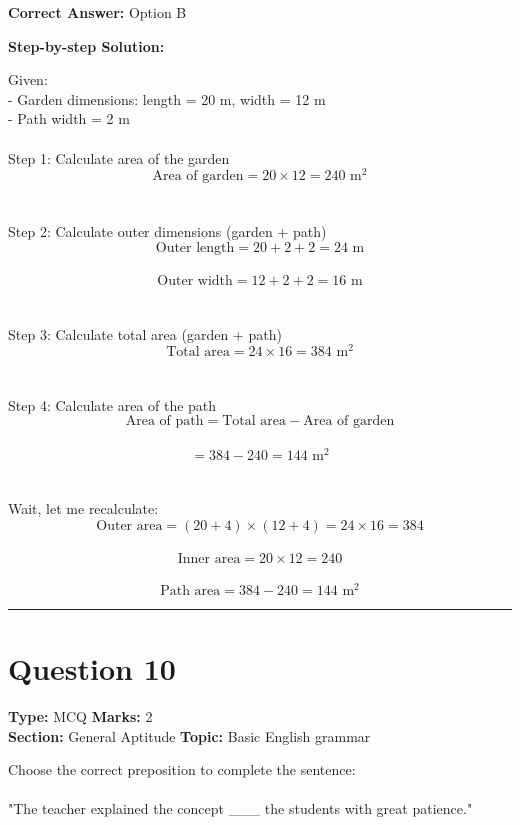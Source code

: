 \documentclass[11pt]{article}
\begin{document}
\textbf{Correct Answer:} Option B

\textbf{Step-by-step Solution:}

Given:\\
 - Garden dimensions: length = 20 m, width = 12 m\\
 - Path width = 2 m\\
\\
 Step 1: Calculate area of the garden\\
 \[\text{Area of garden} = 20 \times 12 = 240 \text{ m}^2\]\\
\\
 Step 2: Calculate outer dimensions (garden + path)\\
 \[\text{Outer length} = 20 + 2 + 2 = 24 \text{ m}\]\\
 \[\text{Outer width} = 12 + 2 + 2 = 16 \text{ m}\]\\
\\
 Step 3: Calculate total area (garden + path)\\
 \[\text{Total area} = 24 \times 16 = 384 \text{ m}^2\]\\
\\
 Step 4: Calculate area of the path\\
 \[\text{Area of path} = \text{Total area} - \text{Area of garden}\]\\
 \[= 384 - 240 = 144 \text{ m}^2\]\\
\\
 Wait, let me recalculate:\\
 \[\text{Outer area} = (20 + 4) \times (12 + 4) = 24 \times 16 = 384\]\\
 \[\text{Inner area} = 20 \times 12 = 240\]\\
 \[\text{Path area} = 384 - 240 = 144 \text{ m}^2\]

\vspace{0.8em}
\hrule
\vspace{0.4em}
\section*{Question 10}
\textbf{Type:} MCQ \hfill \textbf{Marks:} 2\\
\textbf{Section:} General Aptitude \hfill \textbf{Topic:} Basic English grammar

Choose the correct preposition to complete the sentence:\\
\\
 "The teacher explained the concept \_\_\_ the students with great patience."
\end{document}
